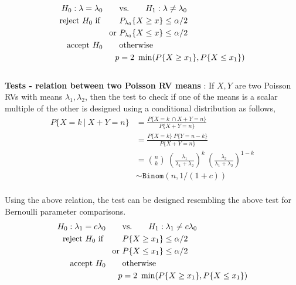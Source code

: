 \begin{align}
	H_0 : \lambda  = \lambda_0 \qquad &\text{vs.} \qquad H_1 : \lambda  \neq \lambda_0 \nonumber \\
	\text{reject $ H_0 $ if } \qquad & P_{\lambda_0}\{X \geq x\} \leq \alpha/2  \nonumber \\
	\text{or }& P_{\lambda_0}\{X \leq x\} \leq \alpha/2 \nonumber \\
	\text{accept $ H_0 $} \qquad & \text{otherwise} \\
	p &= 2\ \min(P\{X \geq x_1\}, P\{X \leq x_1\})
\end{align}\\

\textbf{Tests - relation between two Poisson RV means} : If $ X, Y $ are two Poisson RVs with means $ \lambda_1, \lambda_2 $, then the test to check if one of the means is a scalar multiple of the other is designed using a conditional distribution as follows,\\

\begin{align}
	P \{X = k\ |\ X+Y = n\} &= \frac{P\{X = k\ \cap X+Y = n\}}{P \{X+Y = n\}} \nonumber \\
	&= \frac{P\{X = k\}\ P\{Y = n-k\}}{P \{X+Y = n\}} \nonumber \\
	&= \binom{n}{k}\ \left(\frac{\lambda_1}{\lambda_1+ \lambda_2}\right)^k\ \left(\frac{\lambda_2}{\lambda_1+ \lambda_2}\right)^{1-k} \nonumber \\
	&\sim \texttt{Binom}(n, 1/(1+c))
\end{align}\\

Using the above relation, the test can be designed resembling the above test for Bernoulli parameter comparisons.\\

\begin{align}
	H_0 : \lambda_1  = c\lambda_0 \qquad &\text{vs.} \qquad H_1 : \lambda_1  \neq c\lambda_0 \nonumber \\
	\text{reject $ H_0 $ if } \qquad & P\{X \geq x_1\} \leq \alpha/2  \nonumber \\
	\text{or }& P\{X \leq x_1\} \leq \alpha/2 \nonumber \\
	\text{accept $ H_0 $} \qquad & \text{otherwise} \\
	p &= 2\ \min(P\{X \geq x_1\}, P\{X \leq x_1\})
\end{align}\\
\newpage

